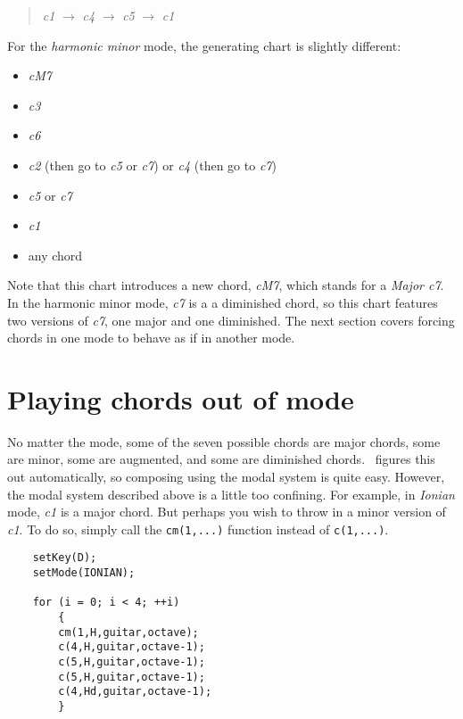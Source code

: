 \documentclass{article}
\begin{document}
\begin{quote}
    {\it c1} $\rightarrow$ {\it c4} $\rightarrow$ {\it c5} $\rightarrow$ {\it c1}
\end{quote}

For the {\it harmonic minor} mode,
the generating chart is slightly different:

\begin{itemize}
\item
        {\it cM7}
\item
        {\it c3}
\item
        {\it c6}
\item
        {\it c2} (then go to {\it c5}
            or {\it c7}) or {\it c4} (then go to {\it c7})
\item
        {\it c5} or {\it c7}
\item
        {\it c1}
\item
        any chord
\end{itemize}

Note that this chart introduces a new chord, {\it cM7}, which stands
for a {\it Major c7}. In the harmonic minor mode, {\it c7} is a a diminished chord,
so this chart features two versions of {\it c7}, one major and one diminished.
The next section covers forcing chords in one mode to behave as if in
another mode.

\section*{Playing chords out of mode}

No matter the mode, some of the seven possible chords are major
chords, some are minor, some are augmented, and some are diminished chords.
\Songlib\ figures this out automatically, so composing using the
modal system is quite easy.
However, the modal system described above is a little
too confining. For example, in {\it Ionian} mode, {\it c1} is a major chord.
But perhaps you wish
to throw in a minor version of {\it c1}.
To do so, simply call the \verb!cm(1,...)! function
instead of \verb!c(1,...)!.

\begin{verbatim}
    setKey(D);
    setMode(IONIAN);

    for (i = 0; i < 4; ++i)
        {
        cm(1,H,guitar,octave);
        c(4,H,guitar,octave-1);
        c(5,H,guitar,octave-1);
        c(5,H,guitar,octave-1);
        c(4,Hd,guitar,octave-1);
        }
\end{verbatim}
\end{document}
